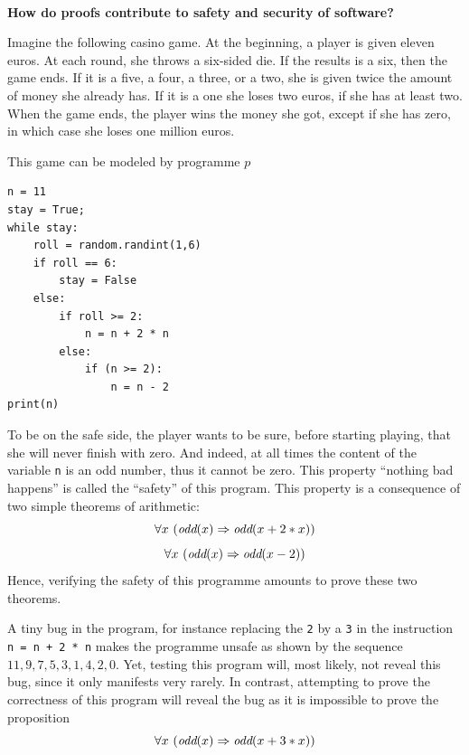 \newpage
~\vfill
\begin{framed}
\vspace*{-0.5cm}
\begin{center}
{\bf \Large How do proofs contribute to safety and security of software?}
\end{center}

Imagine the following casino game. At the beginning, a player is given
eleven euros. At each round, she throws a six-sided die. If the
results is a six, then the game ends.  If it is a five, a four, a
three, or a two, she is given twice the amount of money she already
has. If it is a one she loses two euros, if she has at least two.
When the game ends, the player wins the money she got, except if she
has zero, in which case she loses one million euros.

This game can be modeled by programme $p$
\begin{verbatim}
n = 11
stay = True;
while stay:
    roll = random.randint(1,6)
    if roll == 6:
        stay = False
    else:
        if roll >= 2:
            n = n + 2 * n
        else:
            if (n >= 2):
                n = n - 2
print(n)
\end{verbatim}

To be on the safe side, the player wants to be sure, before starting
playing, that she will never finish with zero.  And indeed, at all times
the content of the variable {\tt n} is an odd number,
thus it cannot be zero. This property ``nothing bad happens'' is
called the ``safety'' of this program. This property is a
consequence of two simple theorems of arithmetic:
$$\forall x~(\mbox{\it odd}(x) \Rightarrow \mbox{\it odd}(x + 2 * x))$$
$$\forall x~(\mbox{\it odd}(x) \Rightarrow \mbox{\it odd}(x - 2))$$
Hence, verifying the safety of this programme
amounts to prove these two theorems.

A tiny bug in the program, for instance replacing the {\tt 2} by a
{\tt 3} in the instruction {\tt n = n + 2 * n} makes the programme unsafe
as shown by the sequence $11, 9, 7, 5, 3, 1, 4, 2, 0$. Yet, testing
this program will, most likely, not reveal this bug, since it only manifests
very rarely.  In contrast, attempting to prove the correctness of this
program will
reveal the bug as it is impossible to prove the proposition
$$\forall x~(\mbox{\it odd}(x) \Rightarrow \mbox{\it odd}(x + 3 * x))$$
\end{framed}
\vfill~
\pagebreak
~\vfill
